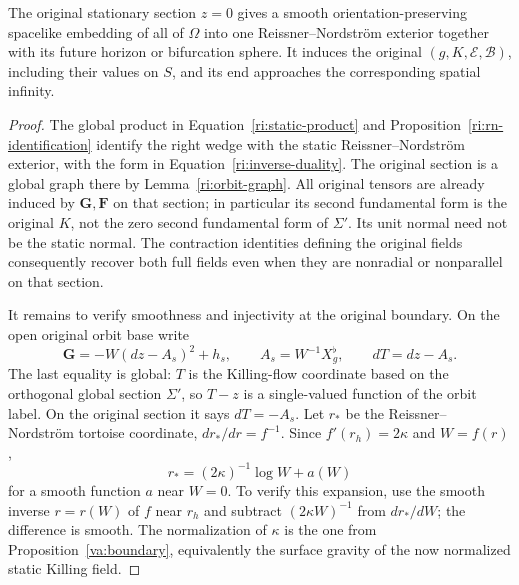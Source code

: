 \begin{proposition}
\label{ri:original-embedding}
The original stationary section $z=0$ gives a smooth
orientation-preserving spacelike embedding of all of $\Omega$
into one Reissner--Nordstr\"om exterior together with its future
horizon or bifurcation sphere.  It induces the original
$(g,K,\mathcal E,\mathcal B)$, including their values on $S$,
and its end approaches the corresponding spatial infinity.
\end{proposition}

\begin{proof}
The global product in Equation~\eqref{ri:static-product} and
Proposition~\ref{ri:rn-identification} identify the right wedge
with the static Reissner--Nordstr\"om exterior, with the form in
Equation~\eqref{ri:inverse-duality}.  The original section is a
global graph there by Lemma~\ref{ri:orbit-graph}.  All original
tensors are already induced by $\mathbf G,\mathbf F$ on that
section; in particular its second fundamental form is the
original $K$, not the zero second fundamental form of $\Sigma'$.
Its unit normal need not be the static normal.  The contraction
identities defining the original fields consequently recover
both full fields even when they are nonradial or nonparallel on
that section.

It remains to verify smoothness and injectivity at the original
boundary.  On the open original orbit base write
\begin{equation}
\label{ri:time-connection}
 \mathbf G=-W(dz-A_s)^2+h_s,\qquad
 A_s=W^{-1}X_g^\flat,\qquad dT=dz-A_s.
\end{equation}
The last equality is global: $T$ is the Killing-flow coordinate
based on the orthogonal global section $\Sigma'$, so $T-z$ is a
single-valued function of the orbit label.  On the original
section it says $dT=-A_s$.
Let $r_*$ be the Reissner--Nordstr\"om tortoise coordinate,
$dr_*/dr=f^{-1}$.  Since $f'(r_h)=2\kappa$ and $W=f(r)$,
\begin{equation}
\label{ri:tortoise}
 r_*=(2\kappa)^{-1}\log W+a(W)
\end{equation}
for a smooth function $a$ near $W=0$.  To verify this expansion,
use the smooth inverse $r=r(W)$ of $f$ near $r_h$ and subtract
$(2\kappa W)^{-1}$ from $dr_*/dW$; the difference is smooth.
The normalization of $\kappa$ is the one from
Proposition~\ref{va:boundary}, equivalently the surface gravity
of the now normalized static Killing field.


\end{proof}
